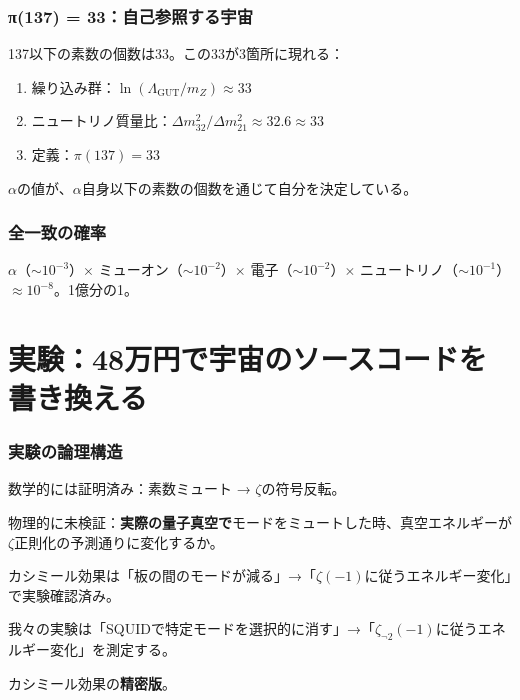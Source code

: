 \documentclass[12pt,a4paper]{article}
\begin{document}
\section{π(137) = 33：自己参照する宇宙}

137以下の素数の個数は33。この33が3箇所に現れる：
\begin{enumerate}
\item 繰り込み群：$\ln(\Lambda_{\mathrm{GUT}}/m_Z) \approx 33$
\item ニュートリノ質量比：$\Delta m^2_{32}/\Delta m^2_{21} \approx 32.6 \approx 33$
\item 定義：$\pi(137) = 33$
\end{enumerate}

$\alpha$の値が、$\alpha$自身以下の素数の個数を通じて自分を決定している。

\section{全一致の確率}

$\alpha$（$\sim 10^{-3}$）$\times$ ミューオン（$\sim 10^{-2}$）$\times$ 電子（$\sim 10^{-2}$）$\times$ ニュートリノ（$\sim 10^{-1}$）$\approx 10^{-8}$。1億分の1。

\part{実験：48万円で宇宙のソースコードを書き換える}

\section{実験の論理構造}

\begin{deepbox}[何を証明するか]
数学的には証明済み：素数ミュート → $\zeta$の符号反転。

物理的に未検証：\textbf{実際の量子真空で}モードをミュートした時、真空エネルギーが$\zeta$正則化の予測通りに変化するか。

カシミール効果は「板の間のモードが減る」→「$\zeta(-1)$に従うエネルギー変化」で実験確認済み。

我々の実験は「SQUIDで特定モードを選択的に消す」→「$\zeta_{\neg 2}(-1)$に従うエネルギー変化」を測定する。

カシミール効果の\textbf{精密版}。
\end{deepbox}
\end{document}
